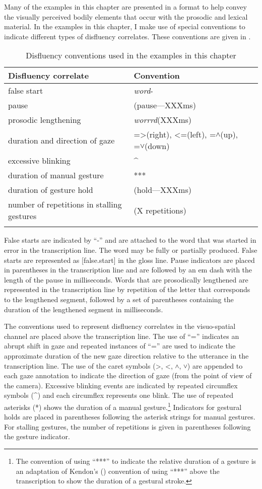 \documentclass[output=paper]{langscibook}
\begin{document}
Many of the examples in this chapter are presented in a format to help convey the visually perceived bodily elements that occur with the prosodic and lexical material. In the examples in this chapter, I make use of special conventions to indicate different types of disfluency correlates. These conventions are given in . 

\begin{table}
\begin{tabularx}{\textwidth}{XX}
\lsptoprule
Disfluency correlate & Convention\\
\midrule
false start & \textit{word}{}-\\
pause & (pause—XXXms)\\
prosodic lengthening & \textit{worrrd}(XXXms)\\
duration and direction of gaze & =>(right), <=(left), =˄(up), =˅(down)\\
excessive blinking & \^{}\\
duration of manual gesture & ***\\
duration of gesture hold & (hold—XXXms)\\
{\small number of repetitions in stalling gestures} & (X repetitions)\\
\lspbottomrule
\end{tabularx}
\caption{\label{tab:rice:3} Disfluency conventions used in the examples in this chapter}
\end{table}

False starts are indicated by “-” and are attached to the word that was started in error in the transcription line. The word may be fully or partially produced. False starts are represented as [false.start] in the gloss line. Pause indicators are placed in parentheses in the transcription line and are followed by an em dash with the length of the pause in milliseconds. Words that are prosodically lengthened are represented in the transcription line by repetition of the letter that corresponds to the lengthened segment, followed by a set of parentheses containing the duration of the lengthened segment in milliseconds.

The conventions used to represent disfluency correlates in the visuo-spatial channel are placed above the transcription line. The use of “=” indicates an abrupt shift in gaze and repeated instances of “=” are used to indicate the approximate duration of the new gaze direction relative to the utterance in the transcription line. The use of the caret symbols (>, <, ˄, ˅) are appended to each gaze annotation to indicate the direction of gaze (from the point of view of the camera). Excessive blinking events are indicated by repeated circumflex symbols (\^{}) and each circumflex represents one blink. The use of repeated asterisks (*) shows the duration of a manual gesture.\footnote{The convention of using “***” to indicate the relative duration of a gesture is an adaptation of Kendon's (\citeyear{Kendon2004d}) convention of using “***” above the transcription to show the duration of a gestural stroke.} Indicators for gestural holds are placed in parentheses following the asterisk strings for manual gestures. For stalling gestures, the number of repetitions is given in parentheses following the gesture indicator.
\end{document}

